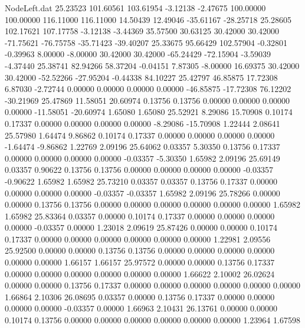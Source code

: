 \begin{filecontents}{NodeLeft.dat}
  25.23523  101.60561  103.61954    -3.12138   -2.47675  100.00000  100.00000  116.11000  116.11000   14.50439   12.49046  -35.61167  -28.25718
  25.28605  102.17621  107.17758    -3.12138   -3.44369   35.57500   30.63125   30.42000   30.42000  -71.75621  -76.75758  -35.71423  -39.40207
  25.33675   95.66429  102.57904    -0.32801   -0.39963    8.00000   -8.00000   30.42000   30.42000  -65.24429  -72.15904   -3.59039   -4.37440
  25.38741   82.94266   58.37204    -0.04151    7.87305   -8.00000   16.69375   30.42000   30.42000  -52.52266  -27.95204   -0.44338   84.10227
  25.42797   46.85875   17.72308     6.87030   -2.72744    0.00000    0.00000    0.00000    0.00000  -46.85875  -17.72308   76.12202  -30.21969
  25.47869   11.58051   20.60974     0.13756    0.13756    0.00000    0.00000    0.00000    0.00000  -11.58051  -20.60974    1.65080    1.65080
  25.52921    8.29086   15.70908     0.10174    0.17337    0.00000    0.00000    0.00000    0.00000   -8.29086  -15.70908    1.22444    2.08641
  25.57980    1.64474    9.86862     0.10174    0.17337    0.00000    0.00000    0.00000    0.00000   -1.64474   -9.86862    1.22769    2.09196
  25.64062    0.03357    5.30350     0.13756    0.17337    0.00000    0.00000    0.00000    0.00000   -0.03357   -5.30350    1.65982    2.09196
  25.69149    0.03357    0.90622     0.13756    0.13756    0.00000    0.00000    0.00000    0.00000   -0.03357   -0.90622    1.65982    1.65982
  25.73210    0.03357    0.03357     0.13756    0.17337    0.00000    0.00000    0.00000    0.00000   -0.03357   -0.03357    1.65982    2.09196
  25.78266    0.00000    0.00000     0.13756    0.13756    0.00000    0.00000    0.00000    0.00000    0.00000    0.00000    1.65982    1.65982
  25.83364    0.03357    0.00000     0.10174    0.17337    0.00000    0.00000    0.00000    0.00000   -0.03357    0.00000    1.23018    2.09619
  25.87426    0.00000    0.00000     0.10174    0.17337    0.00000    0.00000    0.00000    0.00000    0.00000    0.00000    1.22981    2.09556
  25.92500    0.00000    0.00000     0.13756    0.13756    0.00000    0.00000    0.00000    0.00000    0.00000    0.00000    1.66157    1.66157
  25.97572    0.00000    0.00000     0.13756    0.17337    0.00000    0.00000    0.00000    0.00000    0.00000    0.00000    1.66622    2.10002
  26.02624    0.00000    0.00000     0.13756    0.17337    0.00000    0.00000    0.00000    0.00000    0.00000    0.00000    1.66864    2.10306
  26.08695    0.03357    0.00000     0.13756    0.17337    0.00000    0.00000    0.00000    0.00000   -0.03357    0.00000    1.66963    2.10431
  26.13761    0.00000    0.00000     0.10174    0.13756    0.00000    0.00000    0.00000    0.00000    0.00000    0.00000    1.23964    1.67598

\end{filecontents}
